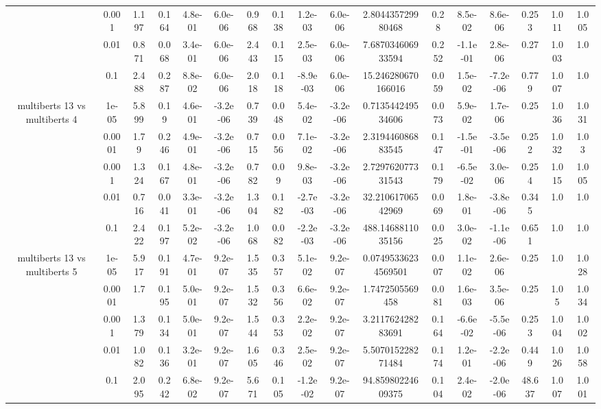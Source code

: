 \begin{tabular}{|c|c|c|c|c|c|c|c|c|c|c|c|c|c|c|c|c|}
 & 0.001 & 1.197 & 0.164 & 4.8e-01 & 6.0e-06 & 0.968 & 0.138 & 1.2e-03 & 6.0e-06 & 2.804435729980468 & 0.28 & 8.5e-02 & 8.6e-06 & 0.253 & 1.011 & 1.005 \\
 & 0.01 & 0.871 & 0.068 & 3.4e-01 & 6.0e-06 & 2.443 & 0.115 & 2.5e-03 & 6.0e-06 & 7.687034606933594 & 0.252 & -1.1e-01 & 2.8e-06 & 0.27 & 1.003 & 1.0 \\
 & 0.1 & 2.488 & 0.287 & 8.8e-02 & 6.0e-06 & 2.018 & 0.118 & -8.9e-03 & 6.0e-06 & 15.246280670166016 & 0.059 & 1.5e-02 & -7.2e-06 & 0.779 & 1.007 & 1.0 \\
\hline
\multirow{5}{*}{multiberts 13 vs multiberts 4} & 1e-05 & 5.899 & 0.19 & 4.6e-01 & -3.2e-06 & 0.739 & 0.048 & 5.4e-02 & -3.2e-06 & 0.713544249534606 & 0.073 & 5.9e-02 & 1.7e-06 & 0.25 & 1.036 & 1.031 \\
 & 0.0001 & 1.79 & 0.246 & 4.9e-01 & -3.2e-06 & 0.715 & 0.056 & 7.1e-02 & -3.2e-06 & 2.319446086883545 & 0.147 & -1.5e-01 & -3.5e-06 & 0.252 & 1.032 & 1.03 \\
 & 0.001 & 1.324 & 0.167 & 4.8e-01 & -3.2e-06 & 0.782 & 0.09 & 9.8e-03 & -3.2e-06 & 2.729762077331543 & 0.179 & -6.5e-02 & 3.0e-06 & 0.254 & 1.015 & 1.005 \\
 & 0.01 & 0.716 & 0.041 & 3.3e-01 & -3.2e-06 & 1.304 & 0.182 & -2.7e-03 & -3.2e-06 & 32.21061706542969 & 0.069 & 1.8e-01 & -3.8e-06 & 0.345 & 1.0 & 1.0 \\
 & 0.1 & 2.422 & 0.197 & 5.2e-02 & -3.2e-06 & 1.068 & 0.082 & -2.2e-03 & -3.2e-06 & 488.1468811035156 & 0.025 & 3.0e-02 & -1.1e-06 & 0.651 & 1.0 & 1.0 \\
\hline
\multirow{5}{*}{multiberts 13 vs multiberts 5} & 1e-05 & 5.917 & 0.191 & 4.7e-01 & 9.2e-07 & 1.535 & 0.357 & 5.1e-02 & 9.2e-07 & 0.07495336234569501 & 0.007 & 1.1e-02 & 2.6e-06 & 0.25 & 1.0 & 1.028 \\
 & 0.0001 & 1.7 & 0.195 & 5.0e-01 & 9.2e-07 & 1.532 & 0.356 & 6.6e-02 & 9.2e-07 & 1.7472505569458 & 0.081 & 1.6e-03 & 3.5e-06 & 0.25 & 1.05 & 1.034 \\
 & 0.001 & 1.379 & 0.134 & 5.0e-01 & 9.2e-07 & 1.544 & 0.353 & 2.2e-02 & 9.2e-07 & 3.211762428283691 & 0.164 & -6.6e-02 & -5.5e-06 & 0.253 & 1.004 & 1.002 \\
 & 0.01 & 1.082 & 0.136 & 3.2e-01 & 9.2e-07 & 1.605 & 0.346 & 2.5e-02 & 9.2e-07 & 5.507015228271484 & 0.174 & 1.2e-01 & -2.2e-06 & 0.449 & 1.026 & 1.058 \\
 & 0.1 & 2.095 & 0.242 & 6.8e-02 & 9.2e-07 & 5.671 & 0.105 & -1.2e-02 & 9.2e-07 & 94.85980224609375 & 0.104 & 2.4e-02 & -2.0e-06 & 48.637 & 1.007 & 1.001 \\

\end{tabular}
